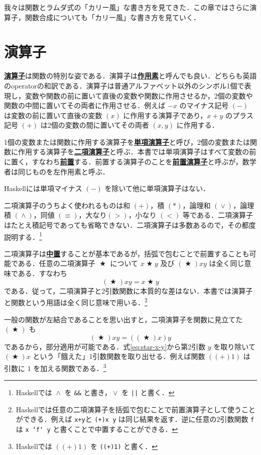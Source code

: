 \documentclass[a5paper,twoside,fleqn,draft]{jsbook}
\newcommand{\programminglanguage}[1]{\textsf{#1}}
\newcommand{\haskell}{\programminglanguage{Haskell}}
\newenvironment{leader}{\begingroup\gt}{\endgroup}
\newcommand{\keyword}[1]{{\underline{\textbf{#1}}}}
\newcommand{\code}[1]{\texttt{#1}}
\DeclareMathOperator{\mBinOp}{\bigstar}
\DeclareMathOperator{\mLogicalAnd}{\wedge}
\DeclareMathOperator{\mLogicalOr}{\vee}
\begin{document}
\begin{leader}
我々は関数とラムダ式の「カリー風」な書き方を見てきた．この章ではさらに演算子，関数合成についても「カリー風」な書き方を見ていく．
\end{leader}

\section{演算子}

\keyword{演算子}は関数の特別な姿である．演算子は\keyword{作用素}と呼んでも良い．どちらも英語のoperatorの和訳である．演算子は普通アルファベット以外のシンボル1個で表現し，変数や関数の前に置いて直後の変数や関数に作用させるか，2個の変数や関数の中間に置いてその両者に作用させる．例えば $-x$ のマイナス記号 $(-)$ は変数の前に置いて直後の変数 $(x)$ に作用する演算子であり，$x+y$ のプラス記号 $(+)$ は2個の変数の間に置いてその両者 $(x,y)$ に作用する．

1個の変数または関数に作用する演算子を\keyword{単項演算子}と呼び，2個の変数または関数に作用する演算子を\keyword{二項演算子}と呼ぶ．本書では単項演算子はすべて変数の前に置く，すなわち\keyword{前置}する．前置する演算子のことを\keyword{前置演算子}と呼ぶが，数学者は同じものを左作用素と呼ぶ．

\haskell には単項マイナス $(-)$ を除いて他に単項演算子はない．

二項演算子のうちよく使われるものは和 $(+)$，積 $(*)$，論理和 $(\mLogicalOr)$，論理積 $(\mLogicalAnd)$，同値 $(\equiv)$，大なり$(>)$，小なり $(<)$ 等である．二項演算子はたとえ積記号であっても省略できない．二項演算子は多数あるので，その都度説明する．\footnote{\haskell では $\mLogicalAnd$ を \code{\&\&} と書き，$\mLogicalOr$ を \code{||} と書く．}

二項演算子は\keyword{中置}することが基本であるが，括弧で包むことで前置することも可能である．任意の二項演算子 $\mBinOp$ について $x\mBinOp y$ 及び $(\mBinOp)xy$ は全く同じ意味である．すなわち
\begin{equation}
  \left(\mBinOp\right)xy
  =x\mBinOp y
\end{equation}
である．従って，二項演算子と2引数関数に本質的な差はない．本書では演算子と関数という用語は全く同じ意味で用いる．\footnote{\haskell では任意の二項演算子を括弧で包むことで前置演算子として使うことができる．例えば \code{x+y}と \code{(+)x y} は同じ結果を返す．逆に任意の2引数関数 \code{f}は \code{x `f` y} と書くことで中置することができる．}

一般の関数が左結合であることを思い出すと，二項演算子を関数に見立てた
$(\mBinOp)$ も
\begin{equation}
  \label{eq:star-x-y}
  (\mBinOp)xy
  =((\mBinOp)x)y
\end{equation}
であるから，部分適用が可能である．式\eqref{eq:star-x-y}から第2引数 $y$ を取り除いて $(\mBinOp)x$ という「餓えた」1引数関数を取り出せる．例えば関数 $((+)1)$ は引数に $1$ を加える関数である．\footnote{\haskell では $((+)1)$ を \code{((+)1)} と書く．}
\end{document}
